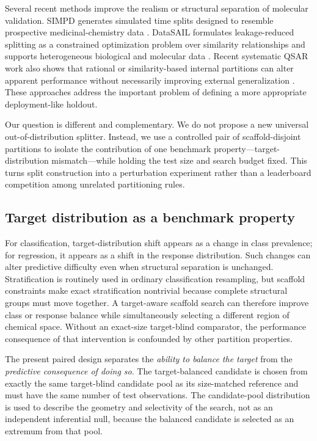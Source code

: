 Several recent methods improve the realism or structural separation of molecular validation. SIMPD generates simulated time splits designed to resemble prospective medicinal-chemistry data \citep{landrum2023simpd}. DataSAIL formulates leakage-reduced splitting as a constrained optimization problem over similarity relationships and supports heterogeneous biological and molecular data \citep{joeres2025datasail}. Recent systematic QSAR work also shows that rational or similarity-based internal partitions can alter apparent performance without necessarily improving external generalization \citep{li2026partition}. These approaches address the important problem of defining a more appropriate deployment-like holdout.

Our question is different and complementary. We do not propose a new universal out-of-distribution splitter. Instead, we use a controlled pair of scaffold-disjoint partitions to isolate the contribution of one benchmark property---target-distribution mismatch---while holding the test size and search budget fixed. This turns split construction into a perturbation experiment rather than a leaderboard competition among unrelated partitioning rules.

\subsection{Target distribution as a benchmark property}

For classification, target-distribution shift appears as a change in class prevalence; for regression, it appears as a shift in the response distribution. Such changes can alter predictive difficulty even when structural separation is unchanged. Stratification is routinely used in ordinary classification resampling, but scaffold constraints make exact stratification nontrivial because complete structural groups must move together. A target-aware scaffold search can therefore improve class or response balance while simultaneously selecting a different region of chemical space. Without an exact-size target-blind comparator, the performance consequence of that intervention is confounded by other partition properties.

The present paired design separates the \emph{ability to balance the target} from the \emph{predictive consequence of doing so}. The target-balanced candidate is chosen from exactly the same target-blind candidate pool as its size-matched reference and must have the same number of test observations. The candidate-pool distribution is used to describe the geometry and selectivity of the search, not as an independent inferential null, because the balanced candidate is selected as an extremum from that pool.

